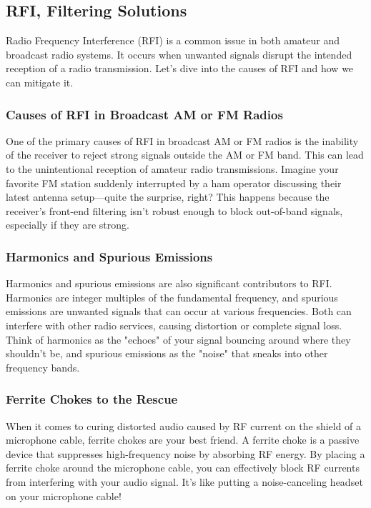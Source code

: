 \subsection{RFI, Filtering Solutions}
\label{subsec:rfi-filters}

Radio Frequency Interference (RFI) is a common issue in both amateur and broadcast radio systems. It occurs when unwanted signals disrupt the intended reception of a radio transmission. Let's dive into the causes of RFI and how we can mitigate it.

\subsubsection*{Causes of RFI in Broadcast AM or FM Radios}
One of the primary causes of RFI in broadcast AM or FM radios is the inability of the receiver to reject strong signals outside the AM or FM band. This can lead to the unintentional reception of amateur radio transmissions. Imagine your favorite FM station suddenly interrupted by a ham operator discussing their latest antenna setup—quite the surprise, right? This happens because the receiver's front-end filtering isn't robust enough to block out-of-band signals, especially if they are strong.

\subsubsection*{Harmonics and Spurious Emissions}
Harmonics and spurious emissions are also significant contributors to RFI. Harmonics are integer multiples of the fundamental frequency, and spurious emissions are unwanted signals that can occur at various frequencies. Both can interfere with other radio services, causing distortion or complete signal loss. Think of harmonics as the "echoes" of your signal bouncing around where they shouldn't be, and spurious emissions as the "noise" that sneaks into other frequency bands.

\subsubsection*{Ferrite Chokes to the Rescue}
When it comes to curing distorted audio caused by RF current on the shield of a microphone cable, ferrite chokes are your best friend. A ferrite choke is a passive device that suppresses high-frequency noise by absorbing RF energy. By placing a ferrite choke around the microphone cable, you can effectively block RF currents from interfering with your audio signal. It's like putting a noise-canceling headset on your microphone cable!


